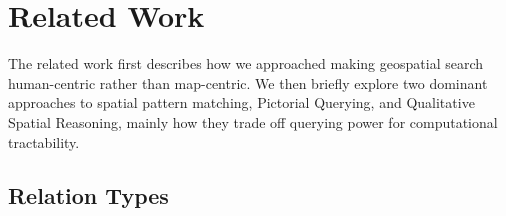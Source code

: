 \section{Related Work}
\label{section:related}


The related work first describes how we approached making geospatial search human-centric rather than map-centric. 
We then briefly explore two dominant approaches to spatial pattern matching, Pictorial Querying, and Qualitative Spatial Reasoning, mainly how they trade off querying power for computational tractability. 

\subsection*{Relation Types}

